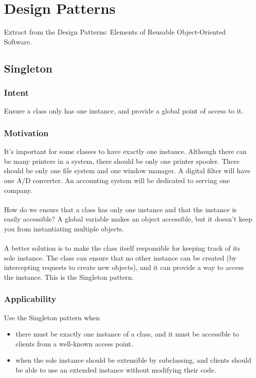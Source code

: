 \chapter{Design Patterns} 

\label{appendix_b}

Extract from the Design Patterns: Elements of Reusable Object-Oriented Software\cite{design_patterns}.

\section{Singleton}

\subsection*{Intent}

Ensure a class only has one instance, and provide a global point of access to it.

\subsection*{Motivation}

It's important for some classes to have exactly one instance. Although there can be many printers in a system, there should be only one printer spooler. There should be only one file system and one window manager. A digital filter will have one A/D converter. An accounting system will be dedicated to serving one company.
\\\\
How do we ensure that a class has only one instance and that the instance is easily accessible? A global variable makes an object accessible, but it doesn't keep you from instantiating multiple objects.
\\\\
A better solution is to make the class itself responsible for keeping track of its sole instance. The class can ensure that no other instance can be created (by intercepting requests to create new objects), and it can provide a way to access the instance. This is the Singleton pattern.

\subsection*{Applicability}

Use the Singleton pattern when

\begin{itemize}
    \item there must be exactly one instance of a class, and it must be accessible to clients from a well-known access point.
    \item when the sole instance should be extensible by subclassing, and clients should be able to use an extended instance without modifying their code.
\end{itemize}

